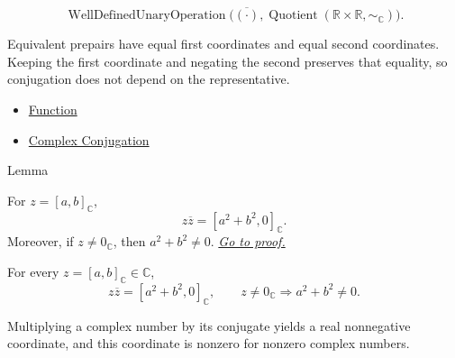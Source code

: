 \begin{remark*}
\[
\operatorname{WellDefinedUnaryOperation}
\bigl(\overline{(\cdot)},\operatorname{Quotient}(\mathbb{R}\times\mathbb{R},\sim_{\mathbb{C}})\bigr).
\]
\end{remark*}

\begin{remark*}[Interpretation]
Equivalent prepairs have equal first coordinates and equal second coordinates.
Keeping the first coordinate and negating the second preserves that equality,
so conjugation does not depend on the representative.
\end{remark*}

\begin{dependencies}
\begin{itemize}
  \item \hyperref[def:function]{Function}
  \item \hyperref[def:complex-conjugation]{Complex Conjugation}
\end{itemize}
\end{dependencies}

\begin{lemmabox}{Lemma}
\begin{lemma}
\label{lem:complex-product-with-conjugate}
For \(z=[a,b]_{\mathbb{C}}\),
\[
z\overline{z}=[a^2+b^2,0]_{\mathbb{C}}.
\]
Moreover, if \(z\ne 0_{\mathbb{C}}\), then \(a^2+b^2\ne 0\).
\hyperref[prf:complex-product-with-conjugate]{\textit{Go to proof.}}
\end{lemma}
\end{lemmabox}


\begin{remark*}
For every $z=[a,b]_{\mathbb{C}}\in\mathbb{C}$,
\[
z\overline{z}=[a^2+b^2,0]_{\mathbb{C}},
\qquad
z\ne 0_{\mathbb{C}}\Longrightarrow a^2+b^2\ne 0.
\]
\end{remark*}

\begin{remark*}[Interpretation]
Multiplying a complex number by its conjugate yields a real nonnegative
coordinate, and this coordinate is nonzero for nonzero complex numbers.
\end{remark*}

